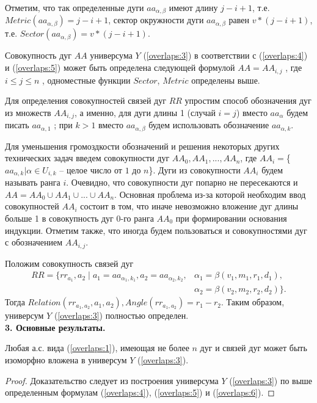 Отметим, что так определенные дуги  $aa_{\alpha,\beta}$  имеют длину $j - i + 1$,  т.е. $Metric(aa_{\alpha,\beta}) =  j - i + 1$,  сектор окружности дуги  $aa_{\alpha,\beta}$  равен  $v * (j - i + 1)$, т.е. $Sector(aa_{\alpha,\beta}) =  v * (j - i + 1)$.

Совокупность дуг  $AA$  универсума  $Y$  (\ref{overlaps:3}) в соответствии с  (\ref{overlaps:4})   и  (\ref{overlaps:5})  может быть определена следующей формулой $AA  =   AA_{i,j}$ , где $i \leq j \leq n$ , одноместные  функции  $Sector$, $Metric$  определены выше.

Для определения  совокупностей связей дуг  $RR$ упростим способ обозначения дуг  из множеств   $AA_{i,j}$, а именно, для дуги длины  1  (случай  $i  = j$)  вместо $aa_\alpha$ будем писать $aa_{\alpha,1}$ ; при  $k > 1$ вместо $aa_{\alpha,\beta}$  будем использовать обозначение $aa_{\alpha, k}$.   

Для уменьшения громоздкости  обозначений и решения некоторых других технических задач введем совокупности дуг  $AA_0, AA_1,..., AA_n$, где  
$AA_i = $\{$aa_{\alpha, k} | \alpha \in U_{i,k}$ -- целое число от $1$  до  $n$\}.  Дуги из совокупности $AA_i$  будем называть ранга  $i$.  Очевидно, что совокупности дуг  попарно не пересекаются и $AA = AA_0 \cup AA_1 \cup ...\cup AA_n$. Основная проблема из-за  которой необходим ввод совокупностей  $AA_i$  состоит в том, что иначе невозможно вложение дуг длины больше  1 в совокупность дуг 0-го ранга  $AA_0$  при формировании основания индукции. Отметим также, что иногда будем пользоваться и совокупностями дуг с обозначением  $AA_{i,j}$. 

Положим   совокупность связей дуг  
\begin{equation}
\begin{split}
RR=\{rr_{a_1}, a_2\;|\;a_1 = aa_{\alpha_1,k_1} , a_2 = aa_{\alpha_2,k_2}, &\alpha_1= \beta(v_1,m_1,r_1,d_1), \\
&\alpha_2 = \beta(v_2,m_2,r_2,d_2) \}.   
\end{split}
\label{overlaps:6}     
\end{equation}
Тогда  $Relation(rr_{a_1, a_2}, a_1, a_2),  Angle(rr_{a_1, a_2}) = r_1 - r_2.$
Таким образом,  универсум  $Y$ (\ref{overlaps:3})   полностью определен. \\

\noindent
\textbf{3. Основные результаты.}

\begin{theorem}
Любая а.с. вида (\ref{overlaps:1}), имеющая не более $n$ дуг и связей дуг может быть изоморфно вложена в универсум  $Y$  (\ref{overlaps:3}).
\label{overlaps:t:1}
\end{theorem}
\begin{proof}
Доказательство следует из построения универсума $Y$  (\ref{overlaps:3}) по выше определенным формулам (\ref{overlaps:4}), (\ref{overlaps:5}) и  (\ref{overlaps:6}).
\end{proof} 

